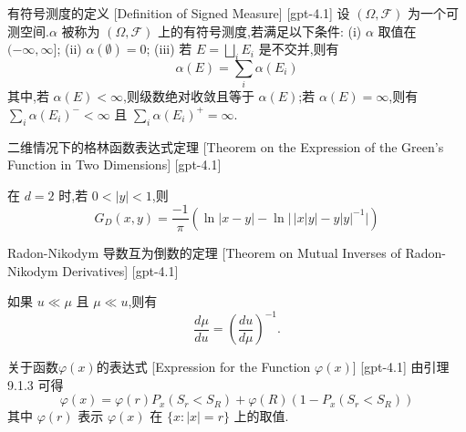 \documentclass[UTF8]{ctexart}
\begin{document}
    
    
    \begin{dfn}
        {有符号测度的定义}
        [Definition of Signed Measure]
        [gpt-4.1]
        设 $(\Omega, \mathcal{F})$ 为一个可测空间.$\alpha$ 被称为 $(\Omega, \mathcal{F})$ 上的有符号测度,若满足以下条件:
(i) $\alpha$ 取值在 $(-\infty, \infty]$;
(ii) $\alpha(\emptyset) = 0$;
(iii) 若 $E = \bigsqcup_i E_i$ 是不交并,则有
\[
\alpha(E) = \sum_i \alpha(E_i)
\]
其中,若 $\alpha(E) < \infty$,则级数绝对收敛且等于 $\alpha(E)$;若 $\alpha(E) = \infty$,则有 $\sum_i \alpha(E_i)^- < \infty$ 且 $\sum_i \alpha(E_i)^+ = \infty$.

    \end{dfn}
    
    
    
    \begin{thm}
        {二维情况下的格林函数表达式定理}
        [Theorem on the Expression of the Green's Function in Two Dimensions]
        [gpt-4.1]
        
在 $d = 2$ 时,若 $0 < |y| < 1$,则
\[
G_D(x, y) = \frac{-1}{\pi} \left( \ln|x - y| - \ln|\,|x|y| - y|y|^{-1}| \right)
\]

    \end{thm}
    
    
    
    \begin{thm}
        {Radon-Nikodym 导数互为倒数的定理}
        [Theorem on Mutual Inverses of Radon-Nikodym Derivatives]
        [gpt-4.1]
        
如果 $
u \ll \mu$ 且 $\mu \ll 
u$,则有
\[
\frac{d\mu}{d
u} = \left(\frac{d
u}{d\mu}\right)^{-1}.
\]

    \end{thm}
    
    
    
    \begin{lma}
        {关于函数$\varphi(x)$的表达式}
        [Expression for the Function $\varphi(x)$]
        [gpt-4.1]
        由引理 9.1.3 可得
\[
\varphi(x) = \varphi(r) P_{x}(S_{r} < S_{R}) + \varphi(R) (1 - P_{x}(S_{r} < S_{R}))
\]
其中 $\varphi(r)$ 表示 $\varphi(x)$ 在 $\{ x : |x| = r \}$ 上的取值.

    \end{lma}
    
\end{document}
